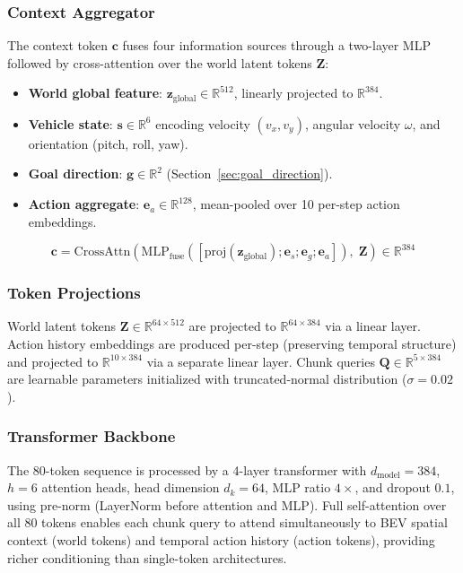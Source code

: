 \documentclass[sensors,article,submit,pdftex,moreauthors]{Definitions/mdpi}
\begin{document}
\subsubsection{Context Aggregator}
The context token $\mathbf{c}$ fuses four information sources through a two-layer MLP followed by cross-attention over the world latent tokens $\mathbf{Z}$:
\begin{itemize}
    \item \textbf{World global feature}: $\mathbf{z}_\text{global} \in \mathbb{R}^{512}$, linearly projected to $\mathbb{R}^{384}$.
    \item \textbf{Vehicle state}: $\mathbf{s} \in \mathbb{R}^{6}$ encoding velocity $(v_x, v_y)$, angular velocity $\omega$, and orientation (pitch, roll, yaw).
    \item \textbf{Goal direction}: $\mathbf{g} \in \mathbb{R}^{2}$ (Section~\ref{sec:goal_direction}).
    \item \textbf{Action aggregate}: $\mathbf{e}_a \in \mathbb{R}^{128}$, mean-pooled over 10 per-step action embeddings.
\end{itemize}
\begin{equation}
    \mathbf{c} = \text{CrossAttn}\!\left(\text{MLP}_\text{fuse}([\text{proj}(\mathbf{z}_\text{global}); \mathbf{e}_s; \mathbf{e}_g; \mathbf{e}_a]),\;\mathbf{Z}\right) \in \mathbb{R}^{384}
\end{equation}

\subsubsection{Token Projections}
World latent tokens $\mathbf{Z} \in \mathbb{R}^{64 \times 512}$ are projected to $\mathbb{R}^{64 \times 384}$ via a linear layer. Action history embeddings are produced per-step (preserving temporal structure) and projected to $\mathbb{R}^{10 \times 384}$ via a separate linear layer. Chunk queries $\mathbf{Q} \in \mathbb{R}^{5 \times 384}$ are learnable parameters initialized with truncated-normal distribution ($\sigma{=}0.02$).

\subsubsection{Transformer Backbone}
The 80-token sequence is processed by a 4-layer transformer with $d_\text{model}{=}384$, $h{=}6$ attention heads, head dimension $d_k{=}64$, MLP ratio $4\times$, and dropout $0.1$, using pre-norm (LayerNorm before attention and MLP). Full self-attention over all 80 tokens enables each chunk query to attend simultaneously to BEV spatial context (world tokens) and temporal action history (action tokens), providing richer conditioning than single-token architectures.
\end{document}
